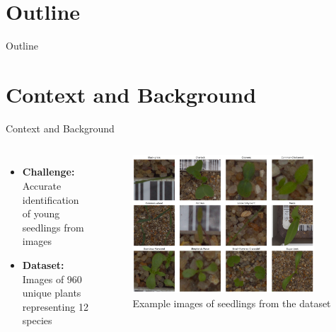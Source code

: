 \documentclass{beamer}
\begin{document}
\begin{frame}
    \titlepage
\end{frame}

\section*{Outline}
\begin{frame}[noframenumbering]{Outline}
    \tableofcontents
\end{frame}
\setcounter{section}{0}

\section{Context and Background}
\begin{frame}{Context and Background}
    \begin{columns}
        \begin{itemize}
            \item \textbf{Challenge:\\}Accurate identification of young seedlings from images~\cite{plant-seedlings-classification}
            \item \textbf{Dataset:\\}Images of 960 unique plants representing 12 species~\cite{DBLP:journals/corr/abs-1711-05458}
        \end{itemize}
        \begin{figure}
            \centering
            \includegraphics[width=0.9\textwidth]{../resources/sample_images.png}
            \caption{Example images of seedlings from the dataset}\label{fig:sample_images}
        \end{figure}
    \end{columns}
\end{frame}
\end{document}
